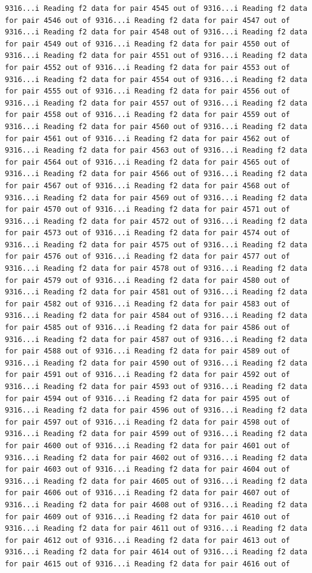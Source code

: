 \documentclass[
]{article}
\begin{document}
\begin{verbatim}
9316...i Reading f2 data for pair 4545 out of 9316...i Reading f2 data for pair 4546 out of 9316...i Reading f2 data for pair 4547 out of 9316...i Reading f2 data for pair 4548 out of 9316...i Reading f2 data for pair 4549 out of 9316...i Reading f2 data for pair 4550 out of 9316...i Reading f2 data for pair 4551 out of 9316...i Reading f2 data for pair 4552 out of 9316...i Reading f2 data for pair 4553 out of 9316...i Reading f2 data for pair 4554 out of 9316...i Reading f2 data for pair 4555 out of 9316...i Reading f2 data for pair 4556 out of 9316...i Reading f2 data for pair 4557 out of 9316...i Reading f2 data for pair 4558 out of 9316...i Reading f2 data for pair 4559 out of 9316...i Reading f2 data for pair 4560 out of 9316...i Reading f2 data for pair 4561 out of 9316...i Reading f2 data for pair 4562 out of 9316...i Reading f2 data for pair 4563 out of 9316...i Reading f2 data for pair 4564 out of 9316...i Reading f2 data for pair 4565 out of 9316...i Reading f2 data for pair 4566 out of 9316...i Reading f2 data for pair 4567 out of 9316...i Reading f2 data for pair 4568 out of 9316...i Reading f2 data for pair 4569 out of 9316...i Reading f2 data for pair 4570 out of 9316...i Reading f2 data for pair 4571 out of 9316...i Reading f2 data for pair 4572 out of 9316...i Reading f2 data for pair 4573 out of 9316...i Reading f2 data for pair 4574 out of 9316...i Reading f2 data for pair 4575 out of 9316...i Reading f2 data for pair 4576 out of 9316...i Reading f2 data for pair 4577 out of 9316...i Reading f2 data for pair 4578 out of 9316...i Reading f2 data for pair 4579 out of 9316...i Reading f2 data for pair 4580 out of 9316...i Reading f2 data for pair 4581 out of 9316...i Reading f2 data for pair 4582 out of 9316...i Reading f2 data for pair 4583 out of 9316...i Reading f2 data for pair 4584 out of 9316...i Reading f2 data for pair 4585 out of 9316...i Reading f2 data for pair 4586 out of 9316...i Reading f2 data for pair 4587 out of 9316...i Reading f2 data for pair 4588 out of 9316...i Reading f2 data for pair 4589 out of 9316...i Reading f2 data for pair 4590 out of 9316...i Reading f2 data for pair 4591 out of 9316...i Reading f2 data for pair 4592 out of 9316...i Reading f2 data for pair 4593 out of 9316...i Reading f2 data for pair 4594 out of 9316...i Reading f2 data for pair 4595 out of 9316...i Reading f2 data for pair 4596 out of 9316...i Reading f2 data for pair 4597 out of 9316...i Reading f2 data for pair 4598 out of 9316...i Reading f2 data for pair 4599 out of 9316...i Reading f2 data for pair 4600 out of 9316...i Reading f2 data for pair 4601 out of 9316...i Reading f2 data for pair 4602 out of 9316...i Reading f2 data for pair 4603 out of 9316...i Reading f2 data for pair 4604 out of 9316...i Reading f2 data for pair 4605 out of 9316...i Reading f2 data for pair 4606 out of 9316...i Reading f2 data for pair 4607 out of 9316...i Reading f2 data for pair 4608 out of 9316...i Reading f2 data for pair 4609 out of 9316...i Reading f2 data for pair 4610 out of 9316...i Reading f2 data for pair 4611 out of 9316...i Reading f2 data for pair 4612 out of 9316...i Reading f2 data for pair 4613 out of 9316...i Reading f2 data for pair 4614 out of 9316...i Reading f2 data for pair 4615 out of 9316...i Reading f2 data for pair 4616 out of 
\end{verbatim}
\end{document}
